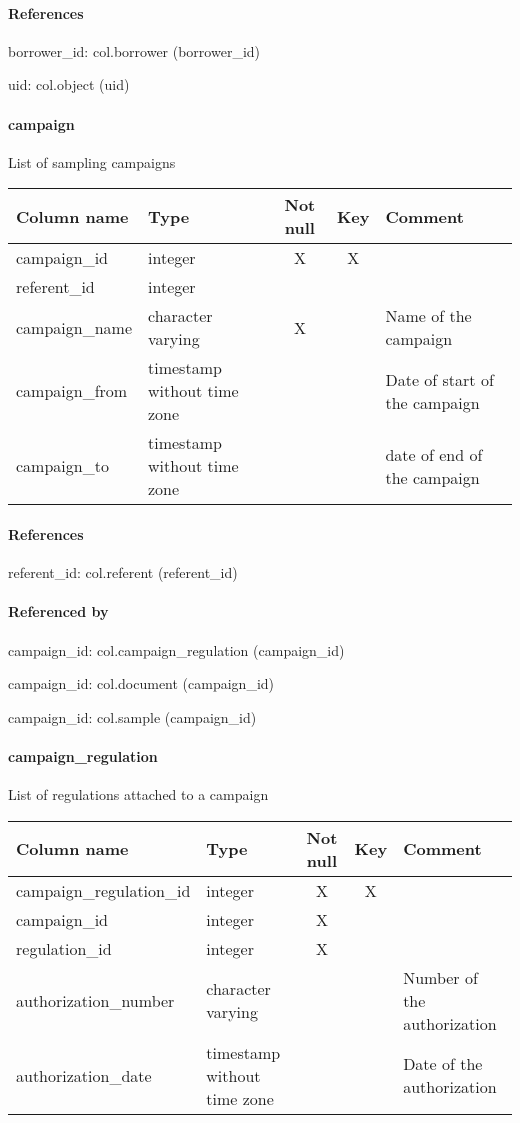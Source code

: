 \paragraph{References}
borrower\_id: col.borrower (borrower\_id)

uid: col.object (uid)

\paragraph{campaign}
List of sampling campaigns

\begin{tabular}{|l| p{2cm}|c|c| p{5cm}|}
\hline
Column name & Type & Not null & Key & Comment \\
\hline
campaign\_id & integer & X & X & \\
referent\_id & integer &  &  & \\
campaign\_name & character varying & X &  & Name of the campaign\\
campaign\_from & timestamp without time zone &  &  & Date of start of the campaign\\
campaign\_to & timestamp without time zone &  &  & date of end of the campaign\\
\hline
\end{tabular}
\paragraph{References}
referent\_id: col.referent (referent\_id)

\paragraph{Referenced by}
campaign\_id: col.campaign\_regulation (campaign\_id)

campaign\_id: col.document (campaign\_id)

campaign\_id: col.sample (campaign\_id)

\paragraph{campaign\_regulation}
List of regulations attached to a campaign

\begin{tabular}{|l| p{2cm}|c|c| p{5cm}|}
\hline
Column name & Type & Not null & Key & Comment \\
\hline
campaign\_regulation\_id & integer & X & X & \\
campaign\_id & integer & X &  & \\
regulation\_id & integer & X &  & \\
authorization\_number & character varying &  &  & Number of the authorization\\
authorization\_date & timestamp without time zone &  &  & Date of the authorization\\
\hline
\end{tabular}
